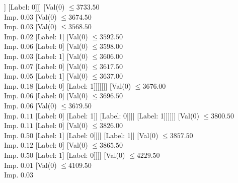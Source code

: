 \documentclass[margin=10pt]{standalone}
\begin{document}
\begin{forest}
										[Val($0$) $ \leq 3560.50$ \\ Imp. $0.02$
											[Label: 0]
											[Val($4$) $ \leq 1929.50$ \\ Imp. $0.02$
												[Val($0$) $ \leq 3590.00$ \\ Imp. $0.06$
													[Label: 0]
													[Val($0$) $ \leq 3726.50$ \\ Imp. $0.10$
														[Val($0$) $ \leq 3630.00$ \\ Imp. $0.01$
															[Label: 0]
															[Label: 1]]
														[Label: 0]]]
												[Val($0$) $ \leq 3733.50$ \\ Imp. $0.03$
													[Val($0$) $ \leq 3674.50$ \\ Imp. $0.03$
														[Val($0$) $ \leq 3568.50$ \\ Imp. $0.02$
															[Label: 1]
															[Val($0$) $ \leq 3592.50$ \\ Imp. $0.06$
																[Label: 0]
																[Val($0$) $ \leq 3598.00$ \\ Imp. $0.03$
																	[Label: 1]
																	[Val($0$) $ \leq 3606.00$ \\ Imp. $0.07$
																		[Label: 0]
																		[Val($0$) $ \leq 3617.50$ \\ Imp. $0.05$
																			[Label: 1]
																			[Val($0$) $ \leq 3637.00$ \\ Imp. $0.18$
																				[Label: 0]
																				[Label: 1]]]]]]]
														[Val($0$) $ \leq 3676.00$ \\ Imp. $0.06$
															[Label: 0]
															[Val($0$) $ \leq 3696.50$ \\ Imp. $0.06$
																[Val($0$) $ \leq 3679.50$ \\ Imp. $0.11$
																	[Label: 0]
																	[Label: 1]]
																[Label: 0]]]]
													[Label: 1]]]]]]
								[Val($0$) $ \leq 3800.50$ \\ Imp. $0.11$
									[Label: 0]
									[Val($0$) $ \leq 3826.00$ \\ Imp. $0.50$
										[Label: 1]
										[Label: 0]]]]
							[Label: 1]]
						[Val($0$) $ \leq 3857.50$ \\ Imp. $0.12$
							[Label: 0]
							[Val($0$) $ \leq 3865.50$ \\ Imp. $0.50$
								[Label: 1]
								[Label: 0]]]]
					[Val($0$) $ \leq 4229.50$ \\ Imp. $0.01$
						[Val($0$) $ \leq 4109.50$ \\ Imp. $0.03$

\end{forest}
\end{document}
